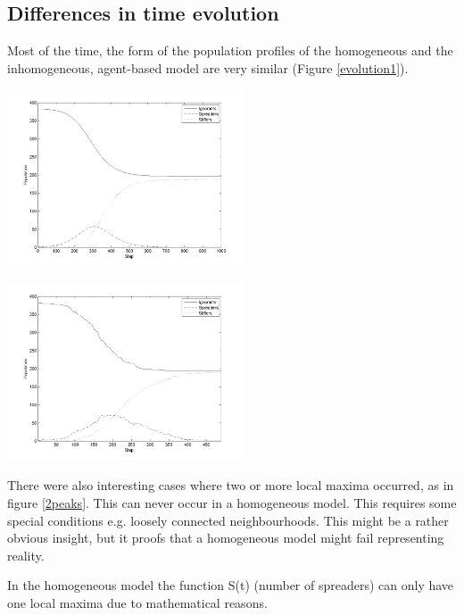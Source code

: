 \subsection{Differences in time evolution}

Most of the time, the form of the population profiles of the homogeneous and the inhomogeneous, agent-based model are very similar (Figure \ref{evolution1}).

\begin{minipage}{0.5\textwidth}
\includegraphics[width=7cm]{NICE_SIR}
\end{minipage}
\begin{minipage}{0.5\textwidth}
\includegraphics[width=7cm]{1-local-max}
\end{minipage}
\label{evolution1}

\noindent There were also interesting cases where two or more local maxima occurred, as in figure \ref{2peaks}. This can never occur in a homogeneous model. This requires some special conditions e.g. loosely connected neighbourhoods. This might be a rather obvious insight, but it proofs that a homogeneous model might fail representing reality. 

\noindent In the homogeneous model the function S(t) (number of spreaders) can only have one local maxima due to mathematical reasons.

